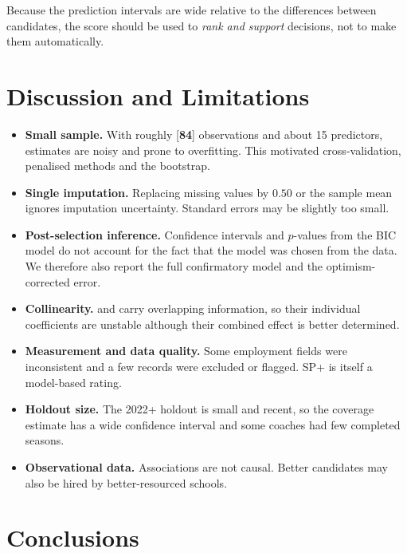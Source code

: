 \documentclass[9pt,a4paper]{article}
\newcommand{\var}[1]{\texttt{\detokenize{#1}}}
\newcommand{\ph}[1]{\textcolor{red!70!black}{[\textbf{#1}]}}
\begin{document}
Because the prediction intervals are wide relative to the differences between candidates, the score should be used to \emph{rank and support} decisions, not to make them automatically.
{\fontsize{9pt}{9.6pt}\selectfont %
\section{Discussion and Limitations}\label{sec:discussion}
\begin{itemize}
  \item \textbf{Small sample.} With roughly \ph{84} observations and about 15 predictors, estimates are noisy and prone to overfitting. This motivated cross-validation, penalised methods and the bootstrap.
  \item \textbf{Single imputation.} Replacing missing values by $0.50$ or the sample mean ignores imputation uncertainty. Standard errors may be slightly too small.
  \item \textbf{Post-selection inference.} Confidence intervals and $p$-values from the BIC model do not account for the fact that the model was chosen from the data. We therefore also report the full confirmatory model and the optimism-corrected error.
  \item \textbf{Collinearity.} \var{AllPriorWinPct} and \var{PreviousWinPct} carry overlapping information, so their individual coefficients are unstable although their combined effect is better determined.
  \item \textbf{Measurement and data quality.} Some employment fields were inconsistent and a few records were excluded or flagged. SP+ is itself a model-based rating.
  \item \textbf{Holdout size.} The 2022+ holdout is small and recent, so the coverage estimate has a wide confidence interval and some coaches had few completed seasons.
  \item \textbf{Observational data.} Associations are not causal. Better candidates may also be hired by better-resourced schools.
\end{itemize}

\section{Conclusions}\label{sec:conclusion}

}
\end{document}

